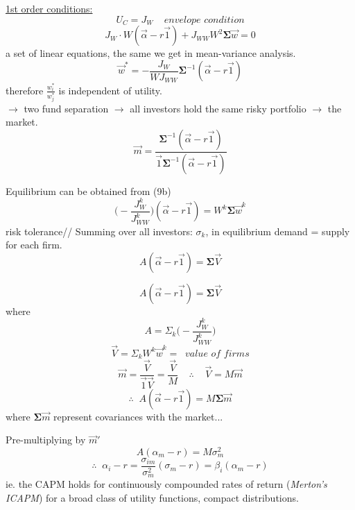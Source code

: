 \documentclass[
14pt,notheorems,hyperref={pdfauthor=whatever}
]{beamer}
\begin{document}
\begin{frame}
\underline{1st order conditions:}\\
\begin{equation} \tag{9a}
    U_C = J_W \;\;\;\; \textit{envelope condition}
\end{equation}
\begin{equation} \tag{9b}
    J_W \cdot W(\vec{\alpha}-r\vec{1}) + J_{WW} W^2 \bm{\Sigma} \vec{w} = 0
\end{equation}
a set of linear equations, the same we get in mean-variance analysis.\\
\begin{equation} \tag{10}
    \vec{w}^* = -\frac{J_W}{W J_{WW}} \bm{\Sigma}^{-1}(\vec{\alpha} - r\vec{1})
\end{equation}
therefore $\frac{w_i^*}{w_j^*}$ is independent of utility.\\
$\longrightarrow$ two fund separation $\longrightarrow$ all investors hold the same risky portfolio $\longrightarrow$ the market.\\
\[\vec{m} = \frac{\bm{\Sigma}^{-1}(\vec{\alpha}-r\vec{1})}{\vec{1} \bm{\Sigma}^{-1}(\vec{\alpha}-r\vec{1})}\]
\end{frame}

\begin{frame}
Equilibrium can be obtained from (9b)
\[ \Bigg(-\frac{J_W^k}{J_{WW}^k}\Bigg)(\vec{\alpha} - r\vec{1}) = W^k \bm{\Sigma} \vec{w}^k \]
risk tolerance//
\hfill\break
Summing over all investors: $\sigma_k$, in equilibrium demand = supply for each firm.\\
\[ A (\vec{\alpha} - r\vec{1}) = \bm{\Sigma}\vec{V} \]
\end{frame}

\begin{frame}
\[ A (\vec{\alpha} - r\vec{1}) = \bm{\Sigma}\vec{V} \]
where
\[ A = \Sigma_k \Bigg(-\frac{J_W^k}{J_{WW}^k}\Bigg) \]
\[ \vec{V} = \Sigma_k W^k \vec{w}^k = \;\;\textit{value of firms} \]
\[ \vec{m} = \frac{\vec{V}}{\vec{1}\vec{V}} = \frac{\vec{V}}{M} \;\;\;\;\therefore\;\;\;\; \vec{V} = M\vec{m}\]
\[ \therefore \;\; A(\vec{\alpha}-r\vec{1}) = M \bm{\Sigma}\vec{m}\]
\hfill\break
where $\bm{\Sigma}\vec{m}$ represent covariances with the market...\\
\end{frame}

\begin{frame}
Pre-multiplying by $\vec{m}'$\\
\[ A(\alpha_m-r) = M \sigma_m^2 \]
\begin{equation} \tag{11}
    \therefore \;\; \alpha_i-r = \frac{\sigma_{im}}{\sigma_m^2}(\sigma_m-r) = \beta_i (\alpha_m -r)
\end{equation}
\hfill\break
ie. the CAPM holds for continuously compounded rates of return (\textit{Merton's ICAPM}) for a broad class of utility functions, compact distributions.
\end{frame}
\end{document}
